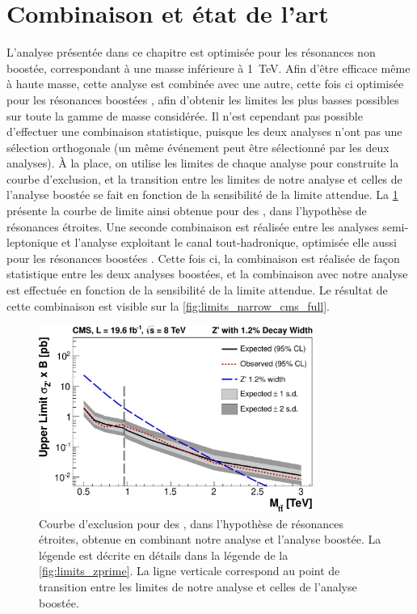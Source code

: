 \section{Combinaison et état de l'art}

L'analyse présentée dans ce chapitre est optimisée pour les résonances non boostée, correspondant à une masse inférieure à \tilde\SI{1}{\TeV}. Afin d'être efficace même à haute masse, cette analyse est combinée avec une autre, cette fois ci optimisée pour les résonances boostées \citep{CMS:lhr}, afin d'obtenir les limites les plus basses possibles sur toute la gamme de masse considérée. Il n'est cependant pas possible d'effectuer une combinaison statistique, puisque les deux analyses n'ont pas une sélection orthogonale (un même événement peut être sélectionné par les deux analyses). À la place, on utilise les limites de chaque analyse pour construite la courbe d'exclusion, et la transition entre les limites de notre analyse et celles de l'analyse boostée se fait en fonction de la sensibilité de la limite attendue. La \cref{fig:limits_narrow_cms} présente la courbe de limite ainsi obtenue pour des \zprime, dans l'hypothèse de résonances étroites. Une seconde combinaison est réalisée entre les analyses semi-leptonique et l'analyse exploitant le canal tout-hadronique, optimisée elle aussi pour les résonances boostées \citep{Chatrchyan:2013lca}. Cette fois ci, la combinaison est réalisée de façon statistique entre les deux analyses boostées, et la combinaison avec notre analyse est effectuée en fonction de la sensibilité de la limite attendue. Le résultat de cette combinaison est visible sur la \cref{fig:limits_narrow_cms_full}.

\begin{figure}[p]
  \centering
  \includegraphics[width=0.80\textwidth]{chapitre7/figs/limits_narrow_combined.pdf}
  \caption{Courbe d'exclusion pour des \zprime, dans l'hypothèse de résonances étroites, obtenue en combinant notre analyse et l'analyse boostée. La légende est décrite en détails dans la légende de la \cref{fig:limits_zprime}. La ligne verticale correspond au point de transition entre les limites de notre analyse et celles de l'analyse boostée.}
  \label{fig:limits_narrow_cms}
\end{figure}

